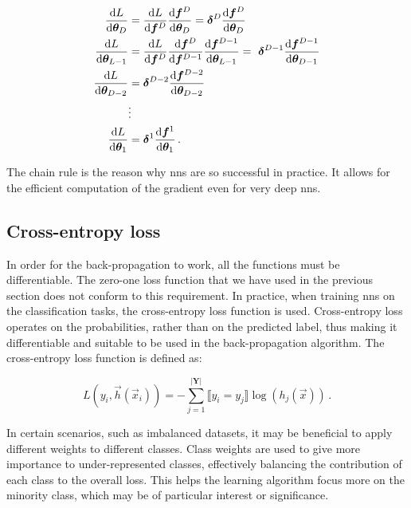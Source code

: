 \begin{align}
    \dv{L}{\nnparams_D}     & = \dv{L}{\vec{f}^D} \dv{\vec{f}^D}{\nnparams_{D}} = \vec{\delta}^D \dv{\vec{f}^D}{\nnparams_{D}} \\
    \dv{L}{\nnparams_{L-1}} & = \dv{L}{\vec{f}^D} \dv{\vec{f}^D}{\vec{f}^{D-1}} \dv{\vec{f}^{D-1}}{\nnparams_{L-1}} =\
    \vec{\delta}^{D-1} \dv{\vec{f}^{D-1}}{\nnparams_{D-1}}                                                                     \\
    \dv{L}{\nnparams_{D-2}} & = \vec{\delta}^{D-2} \dv{\vec{f}^{D-2}}{\nnparams_{D-2}}                                         \\
                            & \vdots \nonumber                                                                                 \\
    \dv{L}{\nnparams_{1}}   & = \vec{\delta}^1 \dv{\vec{f}^1}{\nnparams_{1}}\,.
\end{align}

The chain rule is the reason why \glspl{nn} are so successful in practice. It allows for the efficient computation of
the gradient even for very deep \glspl{nn}.






\subsection{Cross-entropy loss}

In order for the back-propagation to work, all the functions must be differentiable. The zero-one loss function that we
have used in the previous section does not conform to this requirement. In practice, when training \glspl{nn} on the
classification tasks, the cross-entropy loss function is used. Cross-entropy loss operates on the probabilities, rather
than on the predicted label, thus making it differentiable and suitable to be used in the back-propagation algorithm.
The cross-entropy loss function is defined as:

\begin{equation}
    L(y_i, \vec{h}(\vec{x}_i)) = -\sum_{j = 1}^{|\textbf{Y}|} \llbracket y_i = y_j \rrbracket \log(h_j(\vec{x}))\,.
\end{equation}

In certain scenarios, such as imbalanced datasets, it may be beneficial to apply different weights to different classes.
Class weights are used to give more importance to under-represented classes, effectively balancing the contribution of
each class to the overall loss. This helps the learning algorithm focus more on the minority class, which may be of
particular interest or significance.

